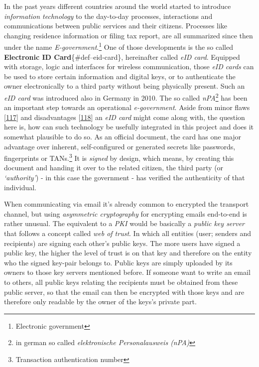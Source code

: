 \documentclass[12pt,english,a4paper,titlepage,cleardoublepage=empty,dottedtoc]{report}
\begin{document}
In the past years different countries around the world started to
introduce \emph{information technology} to the day-to-day processes,
interactions and communications between public services and their
citizens. Processes like changing residence information or filing tax
report, are all summarized since then under the name
\emph{E-government}.\footnote{Electronic government} One of those
developments is the so called \textbf{Electronic ID
Card}\{\#def--eid-card\}, hereinafter called \emph{eID card}. Equipped
with storage, logic and interfaces for wireless communication, those
\emph{eID cards} can be used to store certain information and digital
keys, or to authenticate the owner electronically to a third party
without being physically present. Such an \emph{eID card} was introduced
also in Germany in 2010. The so called \emph{nPA}\footnote{in german so
  called \emph{elektronische Personalausweis (nPA)}} has been an
important step towards an operational \emph{e-government}. Aside from
minor flaws
{[}\protect\hyperlink{ref-web_2013_npa-sicherheitsdefizit}{117}{]} and
disadvantages
{[}\protect\hyperlink{ref-web_2014_test-qes-support-in-npa}{118}{]} an
\emph{eID card} might come along with, the question here is, how can
such technology be usefully integrated in this project and does it
somewhat plausible to do so. As an official document, the card has one
major advantage over inherent, self-configured or generated secrets like
passwords, fingerprints or TANs.\footnote{Transaction authentication
  number} It is \emph{signed} by design, which means, by creating this
document and handing it over to the related citizen, the third party (or
\emph{`authority'}) - in this case the government - has verified the
authenticity of that individual.

When communicating via email it's already common to encrypted the
transport channel, but using \emph{asymmetric cryptography} for
encrypting emails end-to-end is rather unusual. The equivalent to a
\emph{PKI} would be basically a \emph{public key server} that follows a
concept called \emph{web of trust}. In which all entities (user; senders
and recipients) are signing each other's public keys. The more users
have signed a public key, the higher the level of trust is on that key
and therefore on the entity who the signed key-pair belongs to. Public
keys are simply uploaded by its owners to those key servers mentioned
before. If someone want to write an email to others, all public keys
relating the recipients must be obtained from these public server, so
that the email can then be encrypted with those keys and are therefore
only readable by the owner of the keys's private part.
\end{document}
